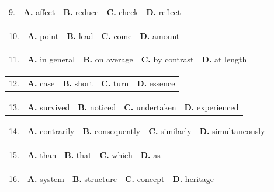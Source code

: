 \documentclass[UTF8,11pt]{ctexart}
\begin{document}
\noindent\begin{tabularx}{\linewidth}{@{}lXXXX@{}}9. & \textbf{A.} affect & \textbf{B.} reduce & \textbf{C.} check & \textbf{D.} reflect\\\end{tabularx}\par

\noindent\begin{tabularx}{\linewidth}{@{}lXXXX@{}}10. & \textbf{A.} point & \textbf{B.} lead & \textbf{C.} come & \textbf{D.} amount\\\end{tabularx}\par

\noindent\begin{tabularx}{\linewidth}{@{}lXXXX@{}}11. & \textbf{A.} in general & \textbf{B.} on average & \textbf{C.} by contrast & \textbf{D.} at length\\\end{tabularx}\par

\noindent\begin{tabularx}{\linewidth}{@{}lXXXX@{}}12. & \textbf{A.} case & \textbf{B.} short & \textbf{C.} turn & \textbf{D.} essence\\\end{tabularx}\par

\noindent\begin{tabularx}{\linewidth}{@{}lXXXX@{}}13. & \textbf{A.} survived & \textbf{B.} noticed & \textbf{C.} undertaken & \textbf{D.} experienced\\\end{tabularx}\par

\noindent\begin{tabularx}{\linewidth}{@{}lXXXX@{}}14. & \textbf{A.} contrarily & \textbf{B.} consequently & \textbf{C.} similarly & \textbf{D.} simultaneously\\\end{tabularx}\par

\noindent\begin{tabularx}{\linewidth}{@{}lXXXX@{}}15. & \textbf{A.} than & \textbf{B.} that & \textbf{C.} which & \textbf{D.} as\\\end{tabularx}\par

\noindent\begin{tabularx}{\linewidth}{@{}lXXXX@{}}16. & \textbf{A.} system & \textbf{B.} structure & \textbf{C.} concept & \textbf{D.} heritage\\\end{tabularx}\par
\end{document}

